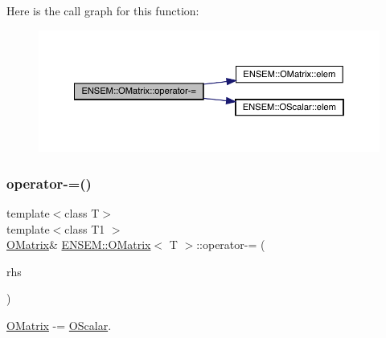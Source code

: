 Here is the call graph for this function\+:
\nopagebreak
\begin{figure}[H]
\begin{center}
\leavevmode
\includegraphics[width=350pt]{dd/d80/classENSEM_1_1OMatrix_a53a1a690a2f39f0c64c6d261efc00e4c_cgraph}
\end{center}
\end{figure}
\mbox{\label{classENSEM_1_1OMatrix_a53a1a690a2f39f0c64c6d261efc00e4c}} 
\subsubsection{\texorpdfstring{operator-\/=()}{operator-=()}\hspace{0.1cm}{\footnotesize\ttfamily [6/6]}}
{\footnotesize\ttfamily template$<$class T$>$ \\
template$<$class T1 $>$ \\
\mbox{\hyperlink{classENSEM_1_1OMatrix}{O\+Matrix}}\& \mbox{\hyperlink{classENSEM_1_1OMatrix}{E\+N\+S\+E\+M\+::\+O\+Matrix}}$<$ T $>$\+::operator-\/= (\begin{DoxyParamCaption}\item[{const \mbox{\hyperlink{classENSEM_1_1OScalar}{O\+Scalar}}$<$ T1 $>$ \&}]{rhs }\end{DoxyParamCaption})\hspace{0.3cm}{\ttfamily [inline]}}



\mbox{\hyperlink{classENSEM_1_1OMatrix}{O\+Matrix}} -\/= \mbox{\hyperlink{classENSEM_1_1OScalar}{O\+Scalar}}. 

